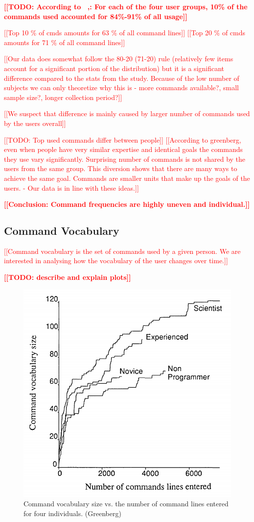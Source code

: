 \documentclass[thesis=M,english]{FITthesis}[2012/10/20]
\newcommand{\todotext}[1]{\textcolor{red}{\textbf{[[#1]]}}}
\newcommand{\redtext}[1]{\textcolor{red}{[[#1]]}}
\newcommand{\tmpframe}[1]{\fbox{#1}}
\renewcommand{\tmpframe}[1]{#1}
\let\myCite\cite
\renewcommand\cite{\unskip~\myCite}
\begin{document}
\todotext{TODO: According to \cite{greenberg1993computer},: For each of the four
user groups, 10\% of the commands used accounted for 84\%-91\% of all usage}


\redtext{Top 10 \% of cmds amounts for 63 \% of all command lines}
\redtext{Top 20 \% of cmds amounts for 71 \% of all command lines}

\redtext{Our data does somewhat follow the 80-20 (71-20) rule (relatively few items account for a significant portion of the distribution) but it is a significant difference compared to the stats from the study. Because of the low number of subjects we can only theoretize why this is - more commands available?, small sample size?, longer collection period?}

\redtext{We suspect that difference is mainly caused by larger number of commands used by the users overall}

\redtext{TODO: Top used commands differ between people}
\redtext{According to greenberg, even when people have very similar expertise and identical goals the commands they use vary significantly. Surprising number of commands is not shared by the users from the same group. This diversion shows that there are many ways to achieve the same goal. Commands are smaller units that make up the goals of the users. - Our data is in line with these ideas.} 

\todotext{Conclusion: Command frequencies are highly uneven and individual.}

\subsection{Command Vocabulary}

\redtext{Command vocabulary is the set of commands used by a given person. We are interested in analysing how the vocabulary of the user changes over time.}

\todotext{TODO: describe and explain plots}



\begin{figure}
\centering
  \tmpframe{\includegraphics[width=0.6\linewidth]{figures/greenberg/plot_ref_cmd-vocab-size.png}}
  \caption{Command vocabulary size vs. the number of command
lines entered for four individuals. (Greenberg)}
\end{figure}
\end{document}
